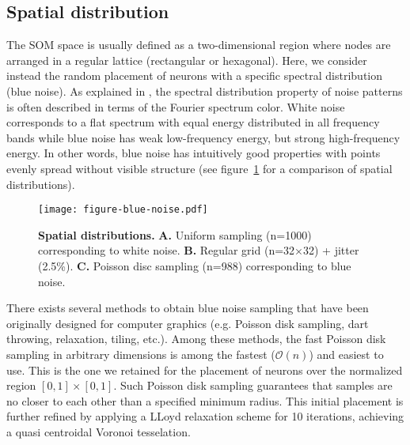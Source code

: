 \subsection{Spatial distribution} %
\label{sec:spatial_dist}

The SOM space is usually defined as a two-dimensional region where nodes are arranged in a regular lattice (rectangular or hexagonal). Here, we consider instead the random placement of neurons with a specific spectral distribution (blue noise). As explained in \citep{Zhou:2012}, the spectral distribution property of noise patterns is often described in terms of the Fourier spectrum color. White noise corresponds to a flat spectrum with equal energy distributed in all frequency bands while blue noise has weak low-frequency energy, but strong high-frequency energy. In other words, blue noise has intuitively good properties with points evenly spread without visible structure (see figure~\ref{fig:sampling} for a comparison of spatial distributions).
\begin{figure}[htbp]
  \texttt{[image: figure-blue-noise.pdf]}
  \caption{\textbf{Spatial distributions.}
    \textbf{\textsf{A.}} Uniform sampling (n=1000) corresponding to white noise.
    \textbf{\textsf{B.}} Regular grid (n=32$\times$32) + jitter (2.5\%).
    \textbf{\textsf{C.}} Poisson disc sampling (n=988) corresponding to blue noise.}
  \label{fig:sampling}
\end{figure}
There exists several methods \citep{Lagae:2008} to obtain blue noise sampling that have been originally designed for computer graphics (e.g. Poisson disk sampling, dart throwing, relaxation, tiling, etc.). Among these methods, the fast Poisson disk sampling in arbitrary dimensions \citep{Bridson:2007} is among the fastest ($\mathcal{O}(n)$) and easiest to use. This is the one we retained for the placement of neurons over the normalized region $[0,1]\times[0,1]$. Such Poisson disk sampling guarantees that samples are no closer to each other than a specified minimum radius. This initial placement is further refined by applying a LLoyd relaxation \citep{Lloyd:1982} scheme for 10 iterations, achieving a quasi centroidal Voronoi tesselation.


